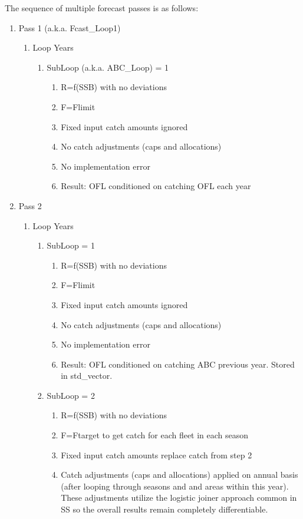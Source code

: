 The sequence of multiple forecast passes is as follows:
\begin{enumerate}
	\item Pass 1 (a.k.a. Fcast\_Loop1)
	\begin{enumerate}
		\item Loop Years
		\begin{enumerate}
			\item SubLoop (a.k.a. ABC\_Loop) = 1
			\begin{enumerate}
				\item R=f(SSB) with no deviations
				\item F=Flimit
				\item Fixed input catch amounts ignored
				\item No catch adjustments (caps and allocations)
				\item No implementation error
				\item Result: OFL conditioned on catching OFL each year
			\end{enumerate}
		\end{enumerate}
	\end{enumerate}
	\item Pass 2
	\begin{enumerate}
		\item Loop Years
		\begin{enumerate}
			\item SubLoop = 1
			\begin{enumerate}
				\item R=f(SSB) with no deviations
				\item F=Flimit
				\item Fixed input catch amounts ignored
				\item No catch adjustments (caps and allocations)
				\item No implementation error
				\item Result: OFL conditioned on catching ABC previous year. Stored in std\_vector.
			\end{enumerate}
			\item SubLoop = 2
			\begin{enumerate}
				\item R=f(SSB) with no deviations
				\item F=Ftarget to get catch for each fleet in each season
				\item Fixed input catch amounts replace catch from step 2
				\item Catch adjustments (caps and allocations) applied on annual basis (after looping through seasons and and areas within this year). These adjustments utilize the logistic joiner approach common in SS so the overall results remain completely differentiable.

\end{enumerate}
\end{enumerate}
\end{enumerate}
\end{enumerate}
